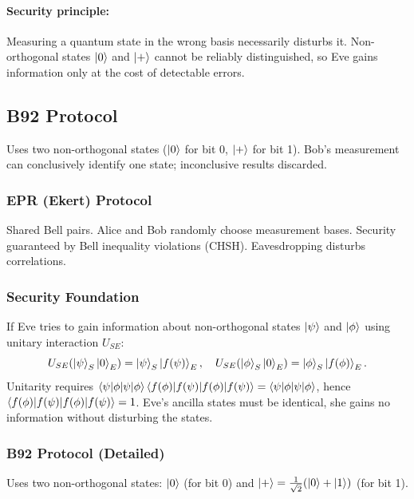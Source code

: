 \documentclass[10pt,a4paper]{article}
\begin{document}
\paragraph{Security principle:} Measuring a quantum state in the wrong basis necessarily disturbs it. Non-orthogonal states $\ket{0}$ and $\ket{+}$ cannot be reliably distinguished, so Eve gains information only at the cost of detectable errors.

\subsection{B92 Protocol}

Uses two non-orthogonal states ($\ket{0}$ for bit 0, $\ket{+}$ for bit 1). Bob's measurement can conclusively identify one state; inconclusive results discarded.

\subsubsection*{EPR (Ekert) Protocol}

Shared Bell pairs. Alice and Bob randomly choose measurement bases. Security guaranteed by Bell inequality violations (CHSH). Eavesdropping disturbs correlations.

\subsubsection*{Security Foundation}

\begin{tcolorbox}[propstyle, title={Theorem: Impossibility of Distinguishing Non-Orthogonal States}]
If Eve tries to gain information about non-orthogonal states $\ket{\psi}$ and $\ket{\phi}$ using unitary interaction $U_{SE}$:
\[
U_{SE}(\ket{\psi}_S\ket{0}_E)=\ket{\psi}_S\ket{f(\psi)}_E,\quad U_{SE}(\ket{\phi}_S\ket{0}_E)=\ket{\phi}_S\ket{f(\phi)}_E.
\]
Unitarity requires $\braket{\psi|\phi}\braket{f(\phi)|f(\psi)}=\braket{\psi|\phi}$, hence $\braket{f(\phi)|f(\psi)}=1$. Eve's ancilla states must be identical, she gains no information without disturbing the states.
\end{tcolorbox}

\subsubsection*{B92 Protocol (Detailed)}

Uses two non-orthogonal states: $\ket{0}$ (for bit 0) and $\ket{+}=\frac{1}{\sqrt{2}}(\ket{0}+\ket{1})$ (for bit 1).
\end{document}
